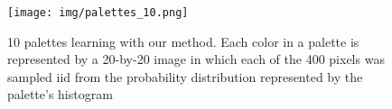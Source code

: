 
\begin{figure}[ht]
\texttt{[image: img/palettes\_10.png]}
\label{ig:colorPalettes}
\caption{10 palettes learning with our method. Each color in a palette is represented by a 20-by-20 image in which each of the 400 pixels was sampled iid from the probability distribution represented by the palette's histogram}
\end{figure}




